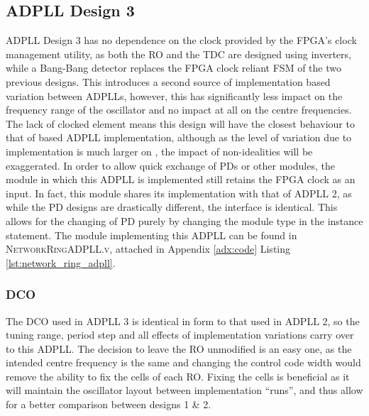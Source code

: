 \subsection{\acs{ADPLL} Design 3}
\acs{ADPLL} Design 3 has no dependence on the clock provided by the \ac{FPGA}'s clock management utility, as both the \ac{RO} and the \ac{TDC} are designed using inverters, while a Bang-Bang detector replaces the \ac{FPGA} clock reliant \ac{FSM} of the two previous designs. This introduces a second source of implementation based variation between \acp{ADPLL}, however, this has significantly less impact on the frequency range of the oscillator and no impact at all on the centre frequencies. The lack of  clocked element means this design will have the closest behaviour to that of  based \ac{ADPLL} implementation, although as the level of variation due to implementation is much larger on , the impact of non-idealities will be exaggerated.
In order to allow quick exchange of \acp{PD} or other modules, the module in which this \ac{ADPLL} is implemented still retains the \ac{FPGA} clock as an input. In fact, this module shares its implementation with that of \ac{ADPLL} 2, as while the \ac{PD} designs are drastically different, the interface is identical. This allows for the changing of \ac{PD} purely by changing the module type in the instance statement. The module implementing this \ac{ADPLL} can be found in \textsc{NetworkRingADPLL.v}, attached in Appendix \ref{adx:code} Listing \ref{lst:network_ring_adpll}.

\subsubsection{\acl{DCO}}
The \ac{DCO} used in \ac{ADPLL} 3 is identical in form to that used in \ac{ADPLL} 2, so the tuning range, period step and all effects of implementation variations carry over to this \ac{ADPLL}. The decision to leave the \ac{RO} unmodified is an easy one, as the intended centre frequency is the same and changing the control code width would remove the ability to fix the cells of each \ac{RO}. Fixing the cells is beneficial as it will maintain the oscillator layout between implementation ``runs'', and thus allow for a better comparison between designs 1 \& 2.

